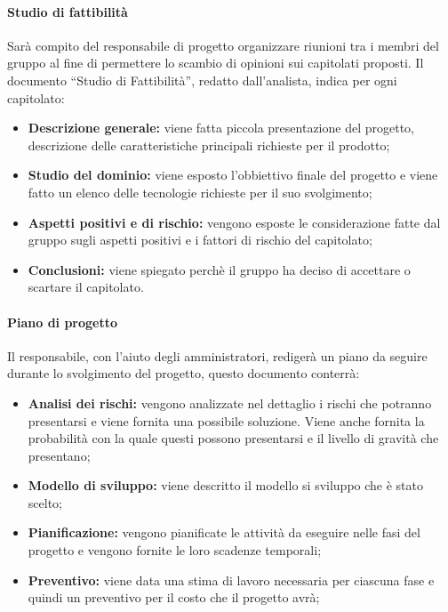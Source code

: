 \paragraph{Studio di fattibilità}
Sarà compito del responsabile di progetto organizzare riunioni tra i membri del gruppo al fine di permettere lo scambio di opinioni sui capitolati proposti.
Il documento ``Studio di Fattibilità'', redatto dall'analista, indica per ogni capitolato:
\begin{itemize}
	\item \textbf{Descrizione generale:} viene fatta piccola presentazione del progetto, descrizione delle caratteristiche principali richieste per il prodotto;
	\item \textbf{Studio del dominio:} viene esposto l'obbiettivo finale del progetto e viene fatto un elenco delle tecnologie richieste per il suo svolgimento;
	\item \textbf{Aspetti positivi e di rischio:} vengono esposte le considerazione fatte dal gruppo sugli aspetti positivi e i fattori di rischio del capitolato;
	\item \textbf{Conclusioni:} viene spiegato perchè il gruppo ha deciso di accettare o scartare il capitolato.
\end{itemize}
\paragraph{Piano di progetto}
Il responsabile, con l'aiuto degli amministratori, redigerà un piano da seguire durante lo svolgimento del progetto, questo documento conterrà:
\begin{itemize}
	\item \textbf{Analisi dei rischi:} vengono analizzate nel dettaglio i rischi che potranno presentarsi e viene fornita una possibile soluzione. Viene anche fornita la probabilità con la quale questi possono presentarsi e il livello di gravità che presentano;
	\item \textbf{Modello di sviluppo:} viene descritto il modello si sviluppo che è stato scelto;
	\item \textbf{Pianificazione:} vengono pianificate le attività da eseguire nelle fasi del progetto e vengono fornite le loro scadenze temporali;
	\item \textbf{Preventivo:} viene data una stima di lavoro necessaria per ciascuna fase e quindi un preventivo per il costo che il progetto avrà;
\end{itemize}
